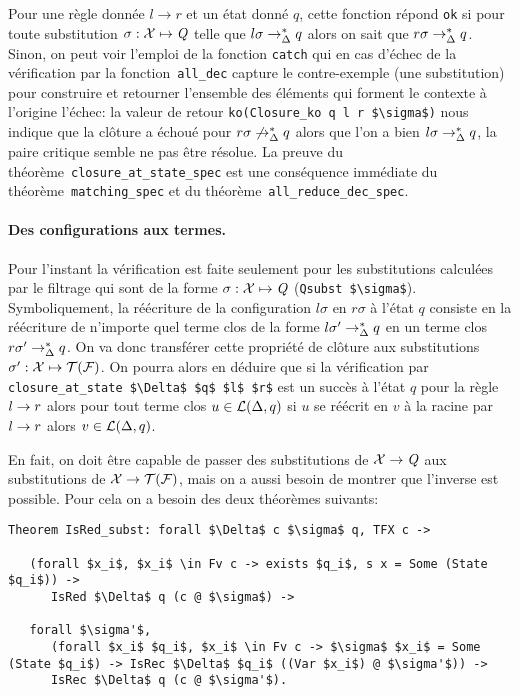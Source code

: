 Pour une règle donnée $l \rightarrow r$ et un état donné $q$, cette fonction répond
\lstinline!ok! si pour toute substitution $\sigma: \mathcal X \mapsto \mathit Q$ telle que $l
\sigma \rightarrow^*_\Delta q$ alors on sait que $r\sigma \rightarrow^*_{\Delta} q$. Sinon, on peut 
voir l'emploi de la fonction \lstinline!catch! qui en cas d'échec de la vérification
par la fonction~\lstinline!all_dec! capture le contre-exemple (une substitution)
pour construire et retourner l'ensemble des éléments qui forment le contexte
à l'origine l'échec: la valeur de retour \lstinline!ko(Closure_ko q l r $\sigma$)!
nous indique que la clôture a échoué pour $r\sigma \not\rightarrow^*_\Delta q$ alors que l'on a bien $l\sigma \rightarrow^*_{\Delta} q$,
la paire critique semble ne pas être résolue. La preuve du théorème~\lstinline!closure_at_state_spec!
est une conséquence immédiate du théorème~\lstinline!matching_spec! et du théorème~\lstinline!all_reduce_dec_spec!.
  

\paragraph{Des configurations aux termes.}

Pour l'instant la vérification est faite seulement pour les substitutions
calculées par le filtrage qui sont de la forme $\sigma:\mathcal X \mapsto \mathit Q$ (\lstinline!Qsubst $\sigma$!).
Symboliquement, la réécriture de la configuration $l\sigma$ en $r\sigma$ à l'état $q$ consiste en la réécriture
de n'importe quel terme clos de la forme $l\sigma' \rightarrow_\Delta^* q$ en un terme clos $r\sigma' \rightarrow_\Delta^* q$.
On va donc transférer cette propriété de clôture aux substitutions $\sigma':\mathcal X \mapsto \mathcal{T(F)}$. On pourra alors en déduire
que si la vérification par \lstinline!closure_at_state $\Delta$ $q$ $l$ $r$! est un succès à l'état $q$ pour la règle
$l \rightarrow r$ alors pour tout terme clos $u \in \mathcal{L}(\Delta, q)$ si $u$ se réécrit en $v$ à la racine par $l\rightarrow r$  alors $v \in \mathcal{L}(\Delta, q)$.

En fait, on doit être capable de passer des substitutions de $\mathcal X \rightarrow \mathit Q$ aux substitutions de $\mathcal X \to \mathcal{T(F)}$, mais on a aussi
besoin de montrer que l'inverse est possible. Pour cela on a besoin des deux théorèmes suivants:


\begin{lstlisting}
Theorem IsRed_subst: forall $\Delta$ c $\sigma$ q, TFX c -> 

   (forall $x_i$, $x_i$ \in Fv c -> exists $q_i$, s x = Some (State $q_i$)) -> 
      IsRed $\Delta$ q (c @ $\sigma$) ->
  
   forall $\sigma'$, 
      (forall $x_i$ $q_i$, $x_i$ \in Fv c -> $\sigma$ $x_i$ = Some (State $q_i$) -> IsRec $\Delta$ $q_i$ ((Var $x_i$) @ $\sigma'$)) ->
      IsRec $\Delta$ q (c @ $\sigma'$).
\end{lstlisting}


